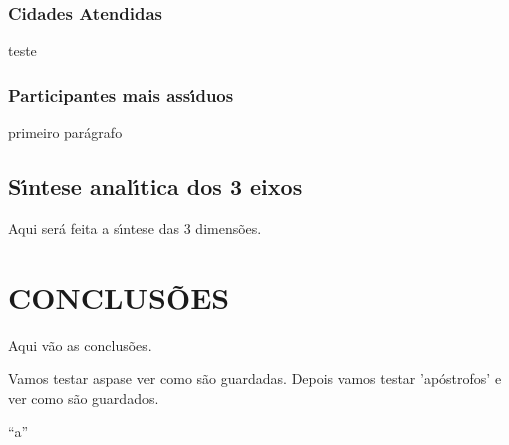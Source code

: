 \documentclass[
12pt,		%
openright,	%
twoside,  %
a4paper,			%
chapter=TITLE,		%
english,			%
french,				%
spanish,			%
brazil				%
]{USPSC-classe/USPSC}
\begin{document}
\subsection[Cidades Atendidas]{Cidades Atendidas}\label{Cidades Atendidas}
teste










\subsection[Participantes mais ass\'{\i}duos]{Participantes mais ass\'{\i}duos}\label{Participantes mais ass\'{\i}duos}
primeiro par\'agrafo










\section[S\'{\i}ntese anal\'{\i}tica dos 3 eixos]{S\'{\i}ntese anal\'{\i}tica dos 3 eixos}\label{S\'{\i}ntese anal\'{\i}tica dos 3 eixos}
Aqui ser\'a feita a s\'{\i}ntese das 3 dimens\~oes.










\chapter[CONCLUS\~OES]{CONCLUS\~OES}\label{CONCLUS\~OES}
Aqui v\~ao as conclus\~oes.










Vamos testar \textquotedbl aspas\textquotedbl  e ver como s\~ao guardadas. Depois vamos testar 'ap\'ostrofos' e ver como s\~ao guardados.










``a''
\end{document}
